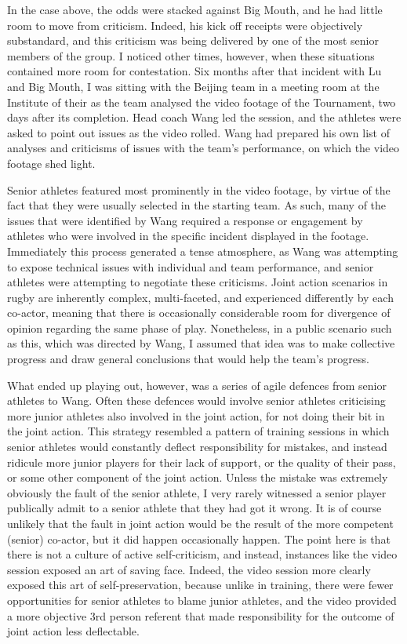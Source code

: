 \begin{CJK}{UTF8}{gbsn}
In the case above, the odds were stacked against Big Mouth, and he had little room to move from criticism.  Indeed, his kick off receipts were objectively substandard, and this criticism was being delivered by one of the most senior members of the group.  I noticed other times, however, when these situations contained more room for contestation.  Six months after that incident with Lu and Big Mouth, I was sitting with the Beijing team in a meeting room at the Institute of their as the team analysed the video footage of the Tournament, two days after its completion.  Head coach Wang led the session, and the athletes were asked to point out issues as the video rolled. Wang had prepared his own list of analyses and criticisms of issues with the team's performance, on which the video footage shed light.

Senior athletes featured most prominently in the video footage, by virtue of the fact that they were usually selected in the starting team.  As such, many of the issues that were identified by Wang required a response or engagement by athletes who were involved in the specific incident displayed in the footage. Immediately this process generated a tense atmosphere, as Wang was attempting to expose technical issues with individual and team performance, and senior athletes were attempting to negotiate these criticisms.  Joint action scenarios in rugby are inherently complex, multi-faceted, and experienced differently by each co-actor, meaning that there is occasionally considerable room for divergence of opinion regarding the same phase of play. Nonetheless, in a public scenario such as this, which was directed by Wang, I assumed that idea was to make collective progress and draw general conclusions that would help the team's progress.

What ended up playing out, however, was a series of agile defences from senior athletes to Wang.  Often these defences would involve senior athletes criticising more junior athletes also involved in the joint action, for not doing their bit in the joint action.  This strategy resembled a pattern of training sessions in which senior athletes would constantly deflect responsibility for mistakes, and instead ridicule more junior players for their lack of support, or the quality of their pass, or some other component of the joint action. Unless the mistake was extremely obviously the fault of the senior athlete, I very rarely witnessed a senior player publically admit to a senior athlete that they had got it wrong. It is of course unlikely that the fault in joint action would be the result of the more competent (senior) co-actor, but it did happen occasionally happen.  The point here is that there is not a culture of active self-criticism, and instead, instances like the video session exposed an art of saving face.  Indeed, the video session more clearly exposed this art of self-preservation, because unlike in training, there were fewer opportunities for senior athletes to blame junior athletes, and the video provided a more objective 3rd person referent that made responsibility for the outcome of joint action less deflectable.


\end{CJK}
